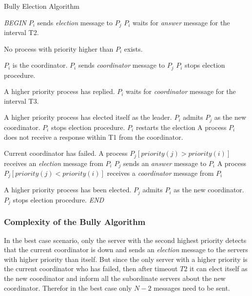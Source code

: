 \documentclass[dareport.tex]{subfiles}
\begin{document}
\begin{algorithm}[H]
	\caption{Bully Election Algorithm}
	\label{bully-algorithm}
	\begin{algorithmic}[1]
		\BState \emph{BEGIN}
			\State $P_{i}$ sends \emph{election} message to $P_{j}$
		\EndFor
		\State $P_{i}$ waits for \emph{answer} message for the interval T2.
		
		\Comment No process with priority higher than $P_{i}$ exists.
		
		\Comment $P_{i}$ is the coordinator.
				\State $P_{i}$ sends \emph{coordinator} message to $P_{j}$
			\EndFor
			\State $P_{i}$ stops election procedure.
		\Else
		
		\Comment A higher priority process has replied.
			\State $P_{i}$ waits for \emph{coordinator} message for the interval T3.
		
		\Comment A higher priority process has elected itself as the leader.
			\State $P_{i}$ admits $P_{j}$ as the new coordinator.
			\State $P_{i}$ stops election procedure.
		\Else
			\State {}
			\Comment $P_{i}$ restarts the election
		\EndIf
		\EndIf
		\EndProcedure
		\State A process $P_{i}$ does not receive a response within T1 from the coordinator.
		
		\Comment Current coordinator has failed.
		\State\indent {}
		\State A process $P_{j} \left[priority(j) > priority(i)\right]$ receives an \emph{election} message from $P_{i}$
		\State\indent $P_{j}$ sends an \emph{answer} message to $P_{i}$
		\State\indent {}
		\State A process $P_{j} \left[priority(j) < priority(i)\right]$ receives a \emph{coordinator} message from $P_{i}$
		
		\Comment A higher priority process has been elected.
		\State\indent $P_{j}$ admits $P_{i}$ as the new coordinator.
		\State\indent $P_{j}$ stops election procedure.
		\BState \emph{END}
	\end{algorithmic}
\end{algorithm}

\subsubsection{Complexity of the Bully Algorithm}\label{sssec:ba-complexity}
In the best case scenario, only the server with the second highest priority detects that the current coordinator is down and sends an \emph{election} message to the servers with higher priority than itself. But since the only server with a higher priority is the current coordinator who has failed, then after timeout $ T2 $ it can elect itself as the new coordinator and inform all the subordinate servers about the new coordinator. Therefor in the best case only $ N-2 $ messages need to be sent.
\end{document}
